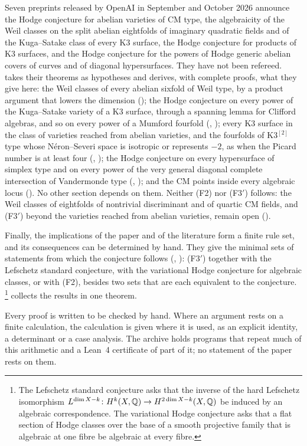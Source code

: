 Seven preprints released by OpenAI in September and October 2026
\cite{OAI26a,OAI26b,OAI26c,OAI26d,OAI26e,OAI26f,OAI26g} announce the Hodge
conjecture for abelian varieties of CM type, the algebraicity of the Weil
classes on the split abelian eightfolds of imaginary quadratic fields and of
the Kuga--Satake class of every K3 surface, the Hodge conjecture for products
of K3 surfaces, and the Hodge conjecture for the powers of Hodge generic
abelian covers of curves and of diagonal hypersurfaces. They have not been
refereed.  takes their theorems as hypotheses and
derives, with complete proofs, what they give here: the Weil classes of every
abelian sixfold of Weil type, by a product argument that lowers the dimension
(); the Hodge conjecture on every power of the
Kuga--Satake variety of a K3 surface, through a spanning lemma for Clifford
algebras, and so on every power of a Mumford fourfold (,
); every K3 surface in the class of varieties reached
from abelian varieties, and the
fourfolds of K3$^{[2]}$ type whose N\'eron--Severi space is isotropic or
represents $-2$, as when the Picard number is at least four
(, ); the Hodge conjecture
on every hypersurface of simplex type and on every power of the very general
diagonal complete intersection of Vandermonde type (,
); and the CM points inside every algebraic locus
(). No other section depends on them. Neither (F2) nor
(F3$'$) follows: the Weil classes of eightfolds of nontrivial discriminant
and of quartic CM fields, and (F3$'$) beyond the varieties reached from
abelian varieties, remain open ().

Finally, the implications of the paper and of the literature form a finite
rule set, and its consequences can be determined by hand. They give the
minimal sets of statements from which the conjecture follows
(, ): (F3$'$) together with the Lefschetz standard
conjecture, with the variational Hodge conjecture for algebraic classes, or
with (F2), besides two sets that are each equivalent to the conjecture.%
\footnote{The Lefschetz standard conjecture asks that the inverse of the
hard Lefschetz isomorphism $L^{\dim X-k}\colon H^{k}(X,\mathbb{Q})\to
H^{2\dim X-k}(X,\mathbb{Q})$ be induced by an algebraic correspondence. The
variational Hodge conjecture asks that a flat section of Hodge classes over
the base of a smooth projective family that is algebraic at one fibre be
algebraic at every fibre.}
 collects the results in one theorem.

Every proof is written to be checked by hand. Where an argument rests on a
finite calculation, the calculation is given where it is used, as an explicit
identity, a determinant or a case analysis. The archive \cite{BMB26} holds
programs that repeat much of this arithmetic and a Lean~4 certificate of part
of it; no statement of the paper rests on them.
